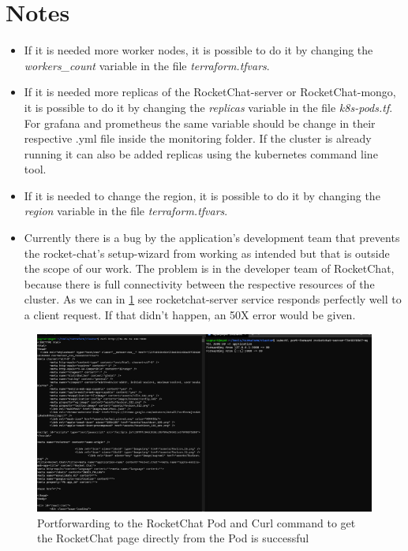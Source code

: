 \documentclass[12pt,a4paper,oneside]{report}
\begin{document}
\section{Notes}
\begin{itemize}
    \item If it is needed more worker nodes, it is possible to do it by changing the \textit{workers\_count} variable in the file \textit{terraform.tfvars}.
    \item If it is needed more replicas of the RocketChat-server or RocketChat-mongo, it is possible to do it by changing the \textit{replicas} variable in the file \textit{k8s-pods.tf}. For grafana and prometheus the same variable should be change in their respective .yml file inside the monitoring folder. If the cluster is already running it can also be added replicas using the kubernetes command line tool.
    \item If it is needed to change the region, it is possible to do it by changing the \textit{region} variable in the file \textit{terraform.tfvars}.
    \item Currently there is a bug by the application's development team that prevents the rocket-chat's setup-wizard from working as intended but that is outside the scope of our work. The problem is in the developer team of RocketChat, because there is full connectivity between the respective resources of the cluster. As we can in \ref{fig:html-from-rocektchar-pod} see rocketchat-server service responds perfectly well to a client request. If that didn't happen, an 50X error would be given.
\end{itemize}

\begin{figure}[h]
    \centering
    \includegraphics[width=1.0\textwidth]{./pictures/curl-success-page-rocketchat.png}
    \caption{Portforwarding to the RocketChat Pod and Curl command to get the RocketChat page directly from the Pod is successful}
    \label{fig:html-from-rocektchar-pod}
\end{figure}
\end{document}
